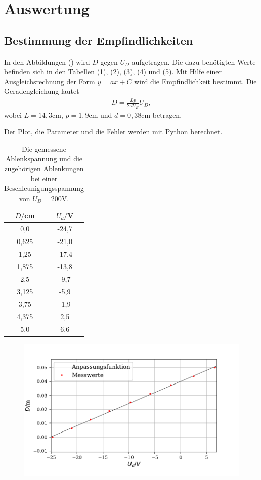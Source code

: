 \section{Auswertung}
\label{sec:Auswertung}
\subsection{Bestimmung der Empfindlichkeiten}

In den Abbildungen () wird $D$ gegen $U_D$ aufgetragen. Die dazu benötigten Werte befinden sich in den Tabellen (1), (2), (3), (4) und (5).
Mit Hilfe einer Ausgleichsrechnung der Form $y = ax + C$ wird die Empfindlichkeit bestimmt.
Die Geradengleichung lautet
\begin{align*}
D = \frac{Lp}{2dU_B}U_D ,
\end{align*}
wobei $L = 14,3 \si{\cm}$, $p = 1,9 \si{\cm} $ und $d = 0,38 \si{\cm}$ betragen.

Der Plot, die Parameter und die Fehler werden mit Python berechnet.

\begin{table}[H]
  \centering
  \caption{Die gemessene Ablenkspannung und die zugehörigen Ablenkungen bei einer Beschleunigungsspannung von $U_B = 200 \si{\volt}$.}
  \label{tab:Parameter}
  \begin{tabular}{c c}
    \toprule
    $D/$cm& $U_d/$V \\
    \bottomrule
    0,0 & -24,7 \\
     0,625 & -21,0  \\
     1,25 & -17,4 \\
     1,875 & -13,8  \\
     2,5 & -9,7 \\
     3,125 & -5,9  \\
     3,75& -1,9  \\
     4,375 & 2,5  \\
     5,0 &  6,6 \\
     \bottomrule
  \end{tabular}
\end{table}

\begin{figure}[H]
  \centering
  \includegraphics{plot3.pdf}
  \caption{}
  \label{fig:plot}
\end{figure}

